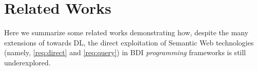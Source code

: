 \section{Related Works}
\label{sec:related-works}




Here we summarize some related works demonstrating how,
despite the many extensions of \agentspeak{} towards \ac{DL},
the direct exploitation of Semantic Web technologies
(namely, \ref{req:direct} and \ref{req:query})
in \ac{BDI} \emph{programming} frameworks is still underexplored.


